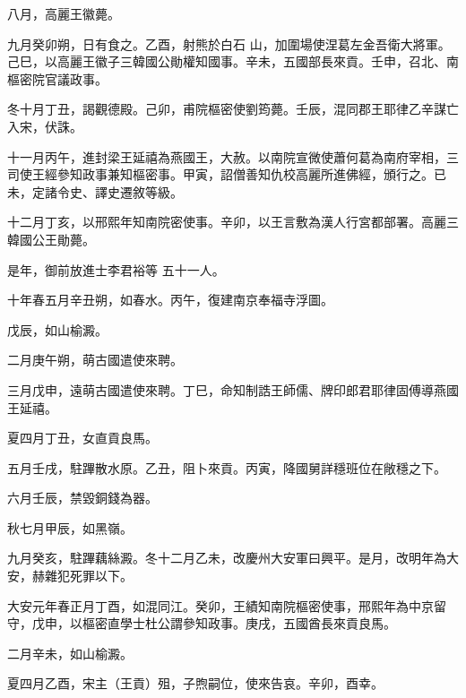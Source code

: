 \begin{pinyinscope}
 八月，高麗王徽薨。



 九月癸卯朔，日有食之。乙酉，射熊於白石
 山，加圍場使涅葛左金吾衛大將軍。己巳，以高麗王徽子三韓國公勛權知國事。辛未，五國部長來貢。壬申，召北、南樞密院官議政事。



 冬十月丁丑，謁觀德殿。己卯，甫院樞密使劉筠薨。壬辰，混同郡王耶律乙辛謀亡入宋，伏誅。



 十一月丙午，進封梁王延禧為燕國王，大赦。以南院宣微使蕭何葛為南府宰相，三司使王經參知政事兼知樞密事。甲寅，詔僧善知仇校高麗所進佛經，頒行之。已未，定諸令史、譯史遷敘等級。



 十二月丁亥，以邢熙年知南院密使事。辛卯，以王言敷為漢人行宮都部署。高麗三韓國公王勛薨。



 是年，御前放進士李君裕等
 五十一人。



 十年春五月辛丑朔，如春水。丙午，復建南京奉福寺浮圖。



 戊辰，如山榆澱。



 二月庚午朔，萌古國遣使來聘。



 三月戊申，遠萌古國遣使來聘。丁巳，命知制誥王師儒、牌印郎君耶律固傅導燕國王延禧。



 夏四月丁丑，女直貢良馬。



 五月壬戌，駐蹕散水原。乙丑，阻卜來貢。丙寅，降國舅詳穩班位在敞穩之下。



 六月壬辰，禁毀銅錢為器。



 秋七月甲辰，如黑嶺。



 九月癸亥，駐蹕藕絲澱。冬十二月乙未，改慶州大安軍曰興平。是月，改明年為大安，赫雜犯死罪以下。



 大安元年春正月丁酉，如混同江。癸卯，王績知南院樞密使事，邢熙年為中京留守，戊申，以樞密直學士杜公謂參知政事。庚戌，五國酋長來貢良馬。



 二月辛未，如山榆澱。



 夏四月乙酉，宋主（王貢）殂，子煦嗣位，使來告哀。辛卯，酉幸。




\end{pinyinscope}
